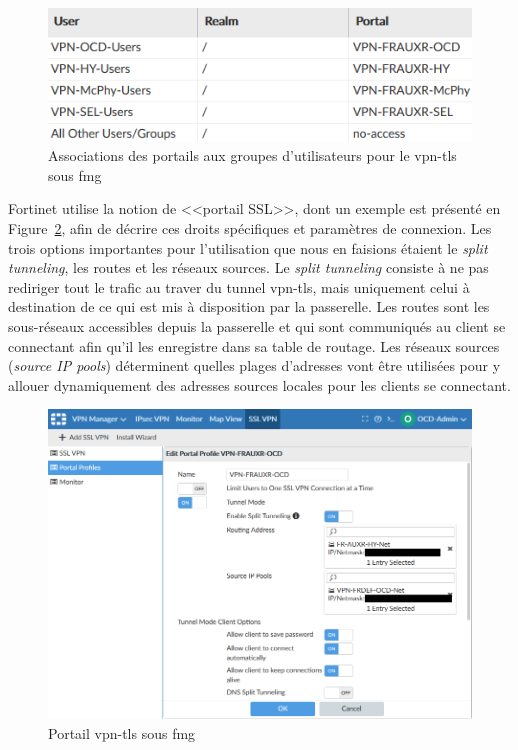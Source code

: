 \documentclass[12pt, oneside, a4paper, titlepage]{report}
\begin{document}
\begin{figure}[h!]
    \centering
    \includegraphics[width = 0.8\linewidth]{img/fmg/ssl-mappings.png}
    \caption{%
        Associations des portails aux groupes d'utilisateurs pour le
        \gls{vpn-tls} sous \acrlong{fmg}%
    }%
    \label{fig:fmg/ssl-mappings}
\end{figure}

Fortinet utilise la notion de <<portail SSL>>, dont un exemple est présenté en
Figure~\ref{fig:fmg/ssl-portal}, afin de décrire ces droits spécifiques et
paramètres de connexion. Les trois options importantes pour l'utilisation que
nous en faisions étaient le \textit{split tunneling}, les routes et les réseaux
sources. Le \textit{split tunneling} consiste à ne pas rediriger tout le trafic
au traver du tunnel \gls{vpn-tls}, mais uniquement celui à destination de ce qui
est mis à disposition par la passerelle. Les routes sont les sous-réseaux
accessibles depuis la passerelle et qui sont communiqués au client se connectant
afin qu'il les enregistre dans sa table de routage. Les réseaux sources
(\textit{source IP pools}) déterminent quelles plages d'adresses vont être
utilisées pour y allouer dynamiquement des adresses sources locales pour les
clients se connectant.

\begin{figure}[h!]
    \centering
    \includegraphics[width = \linewidth]{img/fmg/ssl-portal.png}
    \caption{Portail \gls{vpn-tls} sous \acrlong{fmg}}%
    \label{fig:fmg/ssl-portal}
\end{figure}
\end{document}
